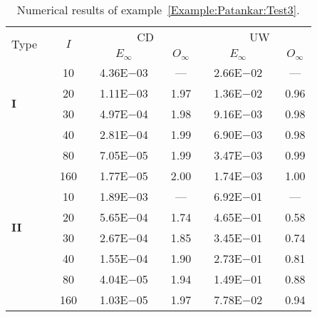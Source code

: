 {\renewcommand{\baselinestretch}{1.0}
\begin{table}[H]
\caption{Numerical results of example~\ref{Example:Patankar:Test3}.}

\setlength{\tabcolsep}{5pt}
\centering
\begin{tabular}{@{}l c c c c c c c c c c@{}}
\toprule
\multirow{2}{*}{Type} &  & \multirow{2}{*}{$I$} &  & \multicolumn{3}{c}{CD} &  & \multicolumn{3}{c}{UW} \\
\cline{5-7}
\cline{9-11}
 & & & & $E_{\infty}$ & & $O_{\infty}$ & & $E_{\infty}$ & & $O_{\infty}$\\
\midrule
\multirow{4}{*}{\textbf{I}} 
 & & 10 & & 4.36E$-$03 & & --- & & 2.66E$-$02 & & ---\\
 & & 20 & & 1.11E$-$03 & & 1.97 & & 1.36E$-$02 & & 0.96\\
 & & 30 & & 4.97E$-$04 & & 1.98 & & 9.16E$-$03 & & 0.98\\
 & & 40 & & 2.81E$-$04 & & 1.99 & & 6.90E$-$03 & & 0.98\\
 & & 80 & & 7.05E$-$05 & & 1.99 & & 3.47E$-$03 & & 0.99\\
 & & 160 & & 1.77E$-$05 & & 2.00 & & 1.74E$-$03 & & 1.00\\
\midrule
\multirow{4}{*}{\textbf{II}} 
 & & 10 & & 1.89E$-$03 & & --- & & 6.92E$-$01 & & ---\\
 & & 20 & & 5.65E$-$04 & & 1.74 & & 4.65E$-$01 & & 0.58\\
 & & 30 & & 2.67E$-$04 & & 1.85 & & 3.45E$-$01 & & 0.74\\
 & & 40 & & 1.55E$-$04 & & 1.90 & & 2.73E$-$01 & & 0.81\\
 & & 80 & & 4.04E$-$05 & & 1.94 & & 1.49E$-$01 & & 0.88\\
 & & 160 & & 1.03E$-$05 & & 1.97 & & 7.78E$-$02 & & 0.94\\
\bottomrule
\end{tabular}
\label{Table:Patankar:Test3}
\end{table}}
